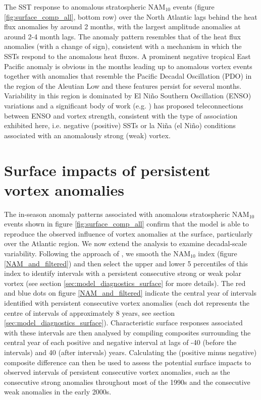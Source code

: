 The SST response to anomalous stratospheric NAM$_{10}$ events (figure \ref{fig:surface_comp_all}, bottom row) over the North Atlantic lags behind the heat flux anomalies by around 2 months, with the largest amplitude anomalies at around 2-4 month lags. The anomaly pattern resembles that of the heat flux anomalies (with a change of sign), consistent with a mechanism in which the SSTs respond to the anomalous heat fluxes. A prominent negative tropical East Pacific anomaly is obvious in the months leading up to anomalous vortex events together with  anomalies that resemble the Pacific Decadal Oscillation (PDO) in the region of the Aleutian Low \citep{mantuaPacific1997a} and these features persist for several months. Variability in this region is dominated by El Ni\~{n}o Southern Oscillation (ENSO) variations and a significant body of work (e.g. \cite{domeisenTeleconnection2019d}) has proposed teleconnections between ENSO and vortex strength, consistent with the type of association exhibited here, i.e. negative (positive) SSTs or la Ni\~{n}a (el Ni\~{n}o) conditions associated with an anomalously strong (weak) vortex. 


\section{Surface impacts of persistent vortex anomalies}
\label{persistent}
The in-season anomaly patterns associated with anomalous stratospheric NAM$_{10}$ events shown in figure \ref{fig:surface_comp_all} confirm that the model is able to reproduce the observed influence of vortex anomalies at the surface, particularly over the Atlantic region. We now extend the analysis to examine decadal-scale variability. Following the approach of \cite{reichlerStratospheric2012b}, we smooth the NAM$_{10}$ index  (figure \ref{NAM_and_filtered}) and then select the upper and lower 5 percentiles of this index to identify intervals with a persistent consecutive strong or weak polar vortex (see section \ref{sec:model_diagnostics_surface} for more details). The red and blue dots on figure \ref{NAM_and_filtered} indicate the central year of intervals identified with persistent consecutive vortex anomalies (each dot represents the centre of intervals of approximately 8 years, see section \ref{sec:model_diagnostics_surface}). Characteristic surface responses associated with these intervals are then analysed by compiling composites surrounding the central year of each positive and negative interval at lags of -40 (before the intervals) and 40 (after intervals) years. Calculating the (positive minus negative) composite difference can then be used to assess the potential surface impacts to observed intervals of persistent consecutive vortex anomalies, such as the consecutive strong anomalies throughout most of the 1990s and the consecutive weak anomalies in the early 2000s. 
 

